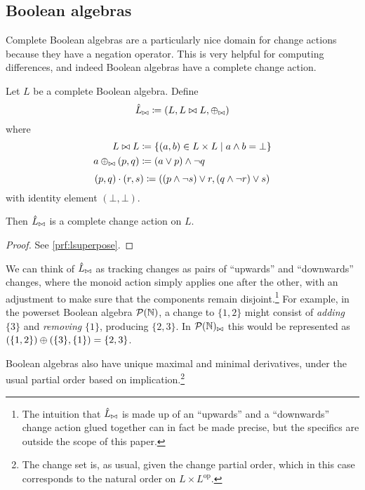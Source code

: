 \subsection{Boolean algebras}
\label{sec:booleanAlgebras}

Complete Boolean algebras are a particularly nice domain for change actions
because they have a negation operator. This is very helpful for computing
differences, and indeed Boolean algebras have a complete change action.

\begin{prop}[name=Boolean algebra change actions, restate=lsuperpose]
 Let $L$ be a complete Boolean algebra. Define
  \begin{displaymath}
    \hat{L}_{\bowtie} \coloneqq (L,L \bowtie L,\oplus_{\bowtie})
  \end{displaymath}
  where
  \begin{align*}
    L \bowtie L &\coloneqq \{ (a, b) \in L \times L \mid a \wedge b = \bot \}\\
    a \oplus_{\bowtie} (p, q) &\coloneqq (a \vee p) \wedge \neg q
  \end{align*}
  \begin{displaymath}
    (p, q) \cdot (r, s) \coloneqq ((p \wedge \neg s) \vee r, (q \wedge \neg r) \vee s)
  \end{displaymath}
  with identity element $(\bot, \bot)$.

  Then $\hat{L}_{\bowtie}$ is a complete change action on $L$.
\end{prop}
\ifproofs
\begin{proof}
  See \cref{prf:lsuperpose}.
\end{proof}
\fi

We can think of $\hat{L}_{\bowtie}$ as tracking changes as pairs of ``upwards'' and
``downwards'' changes, where the monoid action simply applies one after the
other, with an adjustment to make sure that the components remain disjoint.\footnote{
  The intuition that $\hat{L}_{\bowtie}$ is made up of an ``upwards''
  and a ``downwards'' change action glued together can in fact be made precise, but the specifics
  are outside the scope of this paper.} For example, in the powerset Boolean
algebra $\mathcal{P}(\mathbb{N})$, a change to $\{ 1, 2 \}$
might consist of \emph{adding} $\{ 3 \}$ and \emph{removing} $\{ 1 \}$,
producing $\{ 2, 3 \}$. In $\mathcal{P}(\mathbb{N})_{\bowtie}$ this would be
represented as $(\{ 1, 2 \}) \oplus
(\{ 3 \}, \{ 1 \}) = \{ 2, 3 \}$.

Boolean algebras also have unique maximal and minimal
derivatives, under the usual partial order based on implication.\footnote{The change
set is, as usual, given the change partial order, which in this case corresponds to
the natural order on $L \times L^{\textrm{op}}$.}

